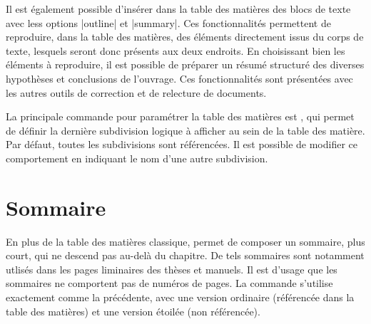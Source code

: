 Il est également possible d'insérer dans la table des matières des blocs de texte avec less options |outline| et |summary|. Ces fonctionnalités permettent de reproduire, dans la table des matières, des éléments directement issus du corps de texte, lesquels seront donc présents aux deux endroits. En choisissant bien les éléments à reproduire, il est possible de préparer un résumé structuré des diverses hypothèses et conclusions de l'ouvrage. Ces fonctionnalités sont présentées avec les autres outils de correction et de relecture de documents.

La principale commande pour paramétrer la table des matières est , qui permet de définir la dernière subdivision logique à afficher au sein de la table des matière. Par défaut, toutes les subdivisions sont référencées. Il est possible de modifier ce comportement en indiquant le nom d'une autre subdivision.

\begin{macro}
\end{macro}

\begin{noprint}
\end{noprint}


\section{Sommaire}

En plus de la table des matières classique, \frenchlaw permet de composer un sommaire, plus court, qui ne descend pas au-delà du chapitre. De tels sommaires sont notamment utlisés dans les pages liminaires des thèses et manuels. Il est d'usage que les sommaires ne comportent pas de numéros de pages. La commande  s'utilise exactement comme la précédente, avec une version ordinaire (référencée dans la table des matières) et une version étoilée (non référencée).


